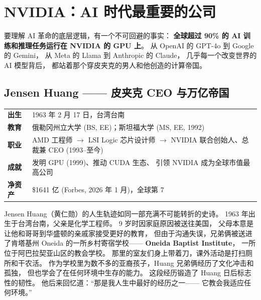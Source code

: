 \section{NVIDIA：AI 时代最重要的公司}
\label{sec:nvidia}

要理解 AI 革命的底层逻辑，有一个不可回避的事实：
\textbf{全球超过 90\% 的 AI 训练和推理任务运行在 NVIDIA 的 GPU 上}。
从 OpenAI 的 GPT-4o 到 Google 的 Gemini，
从 Meta 的 Llama 到 Anthropic 的 Claude，
几乎每一个改变世界的 AI 模型背后，
都站着那个穿皮夹克的男人和他创造的计算帝国。

\subsection{Jensen Huang —— 皮夹克 CEO 与万亿帝国}
\label{subsec:jensen-huang}

\begin{keybox}
\small
\begin{tabularx}{\textwidth}{lX}
\toprule
\textbf{出生} & 1963 年 2 月 17 日，台湾台南 \\
\textbf{教育} & 俄勒冈州立大学 (BS, EE)；斯坦福大学 (MS, EE, 1992) \\
\textbf{职业} & AMD 工程师 $\to$ LSI Logic 芯片设计师 $\to$
                NVIDIA 联合创始人、总裁兼 CEO (1993--至今) \\
\textbf{成就} & 发明 GPU (1999)、推动 CUDA 生态、
                引领 NVIDIA 成为全球市值最高公司 \\
\textbf{净资产} & \$1641 亿 (Forbes, 2026 年 1 月)，全球第 7 \\
\bottomrule
\end{tabularx}
\end{keybox}

Jensen Huang（黄仁勋）的人生轨迹如同一部充满不可能转折的史诗。
1963 年出生于台湾台南，父亲是化学工程师。
9 岁时因家庭原因被送往美国，
父母本意是让他和哥哥到华盛顿的亲戚家接受更好的教育，
但由于沟通失误，兄弟俩被送进了肯塔基州 Oneida 的一所乡村寄宿学校——
\textbf{Oneida Baptist Institute}，
一所位于阿巴拉契亚山区的教会学校。
那里的室友们身上带着刀，课外活动是打扫厕所和干农活。
作为学校里为数不多的亚裔孩子，Huang 兄弟俩经历了文化冲击和孤独，
但也学会了在任何环境中生存的能力。
这段经历锻造了 Huang 日后标志性的韧性。
他后来回忆道：``那是我人生中最好的经历之一——
它教会我适应任何环境。''


